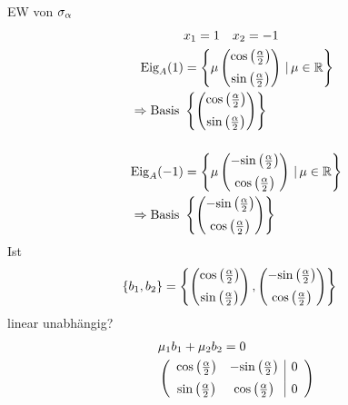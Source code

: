 EW von $\sigalph$
\begin{align*}
    &x_1 = 1 \quad x_2 = -1 \\
    \text{Eig}_A(1) &= \left\{\mu\begin{pmatrix}
        \cosah \\[2mm]
        \sinah
    \end{pmatrix}\,|\,\mu \in \mathbb{R}\right\} \\
    \Rightarrow \text{Basis }&\left\{\begin{pmatrix}
        \cosah \\[2mm]
        \sinah
    \end{pmatrix}\right\} \\[0.5cm]
    \text{Eig}_A(-1) &= \left\{\mu\begin{pmatrix}
        -\sinah \\[2mm]
        \cosah
    \end{pmatrix}\,|\,\mu \in \mathbb{R}\right\} \\
    \Rightarrow \text{Basis }&\left\{\begin{pmatrix}
        -\sinah \\[2mm]
        \cosah
    \end{pmatrix}\right\}
\end{align*}
Ist
\begin{align*}
    \{b_1, b_2\} &= \left\{\begin{pmatrix}
        \cosah \\[2mm]
        \sinah
    \end{pmatrix}, \begin{pmatrix}
        -\sinah \\[2mm]
        \cosah
    \end{pmatrix}\right\}
\end{align*}
linear unabhängig?
\begin{align*}
    &\mu _1 b_1 + \mu _2 b_2 = 0 \\
    &\left(\begin{array}{cc|c}
        \cosah & -\sinah & 0 \\[2mm]
        \sinah & \cosah & 0
    \end{array}\right) \\
\end{align*}










